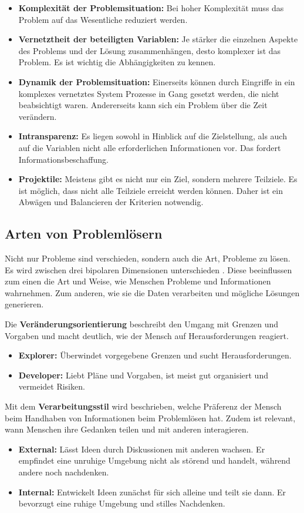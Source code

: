 \begin{itemize}
\item \textbf{Komplexität der Problemsituation:} Bei hoher Komplexität muss das Problem auf das Wesentliche reduziert werden. 
\item \textbf{Vernetztheit der beteiligten Variablen:} Je stärker die einzelnen Aspekte des Problems und der Lösung zusammenhängen, desto komplexer ist das Problem. Es ist wichtig die Abhängigkeiten zu kennen.
\item \textbf{Dynamik der Problemsituation:} Einerseits können durch Eingriffe in ein komplexes vernetztes System Prozesse in Gang gesetzt werden, die nicht beabsichtigt waren. Andererseits kann sich ein Problem über die Zeit verändern.
\item \textbf{Intransparenz:} Es liegen sowohl in Hinblick auf die Zielstellung, als auch auf die Variablen nicht alle erforderlichen Informationen vor. Das fordert Informationsbeschaffung.
\item \textbf{Projektile:} Meistens gibt es nicht nur ein Ziel, sondern mehrere Teilziele. Es ist möglich, dass nicht alle Teilziele erreicht werden können. Daher ist ein Abwägen und Balancieren der Kriterien notwendig.
\end{itemize}

\subsection{Arten von Problemlösern}
Nicht nur Probleme sind verschieden, sondern auch die Art, Probleme zu lösen. Es wird zwischen drei bipolaren Dimensionen unterschieden \cite{Betsch2011}. Diese beeinflussen zum einen die Art und Weise, wie Menschen Probleme und Informationen wahrnehmen. Zum anderen, wie sie die Daten verarbeiten und mögliche Lösungen generieren.

Die \textbf{Veränderungsorientierung} beschreibt den Umgang mit Grenzen und Vorgaben und macht deutlich, wie der Mensch auf Herausforderungen reagiert.
	\begin{itemize}
	\item \textbf{Explorer:} Überwindet vorgegebene Grenzen und sucht Herausforderungen.
	\item \textbf{Developer:} Liebt Pläne und Vorgaben, ist meist gut organisiert und vermeidet Risiken.
	\end{itemize}

Mit dem \textbf{Verarbeitungsstil} wird beschrieben, welche Präferenz der Mensch beim Handhaben von Informationen beim Problemlösen hat. Zudem ist relevant, wann Menschen ihre Gedanken teilen und mit anderen interagieren.
	\begin{itemize}
	\item \textbf{External:} Lässt Ideen durch Diskussionen mit anderen wachsen. Er empfindet eine unruhige Umgebung nicht als störend und handelt, während andere noch nachdenken.
	\item \textbf{Internal:} Entwickelt Ideen zunächst für sich alleine und teilt sie dann. Er bevorzugt eine ruhige Umgebung und stilles Nachdenken.
	\end{itemize}
	
